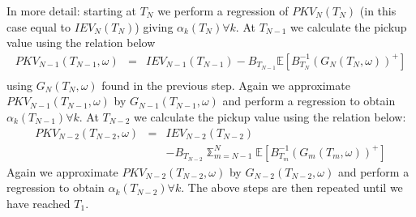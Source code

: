 In more detail: starting at $T_N$ we perform a regression of $PKV_N(T_N)$ (in this case equal to $IEV_N(T_N)$) giving $\alpha_k(T_N) \forall k$. At $T_{N-1}$ we calculate the pickup value using the relation below
\begin{eqnarray}
PKV_{N-1}(T_{N-1}, \omega) &=& IEV_{N-1}(T_{N-1}) - B_{T_{N-1}} \mathbb E \left[B_{T_{N}}^{-1} (G_N(T_N, \omega))^{+} \right] \nonumber \\
                           & &
\end{eqnarray}
using $G_N(T_N, \omega)$ found in the previous step. Again we approximate $PKV_{N-1}(T_{N-1},\omega)$ by $G_{N-1}(T_{N-1}, \omega)$ and perform a regression to obtain $\alpha_k(T_{N-1}) \forall k$. At $T_{N-2}$ we calculate the pickup value using the relation below:
\begin{eqnarray}
PKV_{N-2}(T_{N-2}, \omega) &=& IEV_{N-2}(T_{N-2}) \nonumber \\
& & - B_{T_{N-2}} \mathbb \sum_{m=N-1}^N \mathbb E \left[B_{T_{m}}^{-1} (G_m(T_m, \omega))^{+} \right]
\end{eqnarray}
Again we approximate $PKV_{N-2}(T_{N-2},\omega)$ by $G_{N-2}(T_{N-2}, \omega)$ and perform a regression to obtain $\alpha_k(T_{N-2}) \forall k$. The above steps are then repeated until we have reached $T_1$.

